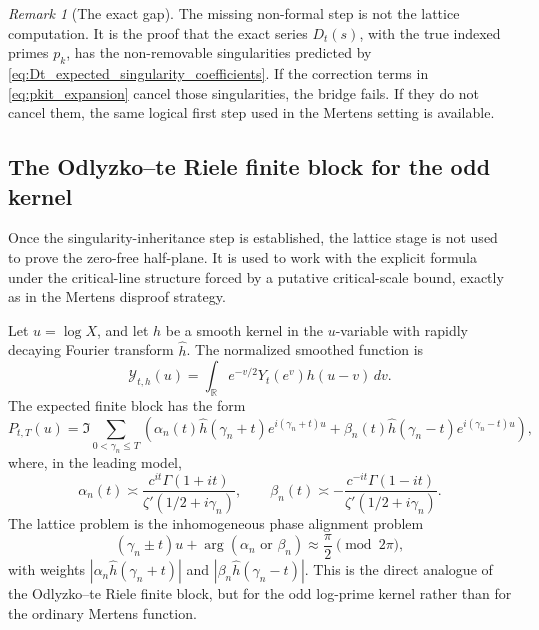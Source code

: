 \documentclass[11pt]{amsart}
\numberwithin{equation}{section}
\theoremstyle{plain}
\theoremstyle{definition}
\theoremstyle{remark}
\newtheorem{remark}[theorem]{Remark}
\begin{document}
\begin{remark}[The exact gap]
\label{rem:Yt_exact_gap}
The missing non-formal step is not the lattice computation.  It is the proof that the exact series \(D_t(s)\), with the true indexed primes \(p_k\), has the non-removable singularities predicted by \eqref{eq:Dt_expected_singularity_coefficients}.  If the correction terms in \eqref{eq:pkit_expansion} cancel those singularities, the bridge fails.  If they do not cancel them, the same logical first step used in the Mertens setting is available.
\end{remark}

\subsection{The Odlyzko--te Riele finite block for the odd kernel}
\label{subsec:Yt_odlyzko_block}

Once the singularity-inheritance step is established, the lattice stage is not used to prove the zero-free half-plane.  It is used to work with the explicit formula under the critical-line structure forced by a putative critical-scale bound, exactly as in the Mertens disproof strategy.

Let \(u=\log X\), and let \(h\) be a smooth kernel in the \(u\)-variable with rapidly decaying Fourier transform \(\widehat h\).  The normalized smoothed function is
\begin{equation}
\mathcal Y_{t,h}(u)
=\int_{\mathbb R} e^{-v/2}Y_t(e^v)h(u-v)\,dv.
\label{eq:Yt_smoothed_log_variable}
\end{equation}
The expected finite block has the form
\begin{equation}
P_{t,T}(u)=
\Im\sum_{0<\gamma_n\leq T}
\left(
\alpha_n(t)\widehat h(\gamma_n+t)e^{i(\gamma_n+t)u}
+\beta_n(t)\widehat h(\gamma_n-t)e^{i(\gamma_n-t)u}
\right),
\label{eq:Yt_odlyzko_finite_block}
\end{equation}
where, in the leading model,
\begin{equation}
\alpha_n(t)\asymp \frac{c^{it}\Gamma(1+it)}{\zeta'(1/2+i\gamma_n)},
\qquad
\beta_n(t)\asymp -\frac{c^{-it}\Gamma(1-it)}{\zeta'(1/2+i\gamma_n)}.
\label{eq:Yt_odlyzko_coefficients_leading}
\end{equation}
The lattice problem is the inhomogeneous phase alignment problem
\begin{equation}
(\gamma_n\pm t)u+\arg(\alpha_n \text{ or }\beta_n)
\approx \frac{\pi}{2}\pmod{2\pi},
\label{eq:Yt_phase_alignment_problem}
\end{equation}
with weights \(|\alpha_n\widehat h(\gamma_n+t)|\) and \(|\beta_n\widehat h(\gamma_n-t)|\).  This is the direct analogue of the Odlyzko--te Riele finite block, but for the odd log-prime kernel rather than for the ordinary Mertens function.
\end{document}
